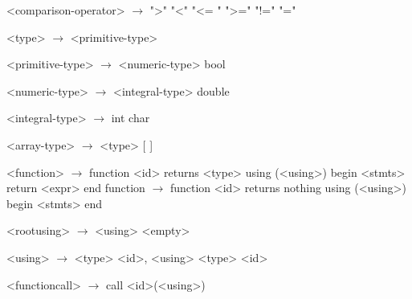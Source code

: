 \documentclass{article}
\begin{document}
\begin{grammar}
<comparison-operator> $\rightarrow$ ">"
				\alt "<"
				\alt "<= "
				\alt ">="
				\alt "!="
				\alt "="

<type> $\rightarrow$ <primitive-type>

<primitive-type> $\rightarrow$ <numeric-type>
\alt bool

<numeric-type> $\rightarrow$ <integral-type>
\alt double

<integral-type> $\rightarrow$ int
\alt char

<array-type> $\rightarrow$ <type> [ ]

<function> $\rightarrow$  function <id> returns <type> using (<using>)
begin
	<stmts>
	return <expr>
end
\alt function $\rightarrow$ function <id> returns nothing using (<using>)
begin
	<stmts>
end

<rootusing> $\rightarrow$ <using>
	\alt <empty>

<using> $\rightarrow$ <type> <id>, <using>
\alt <type> <id>

<functioncall> $\rightarrow$ call <id>(<using>)

\end{grammar}
\end{document}
